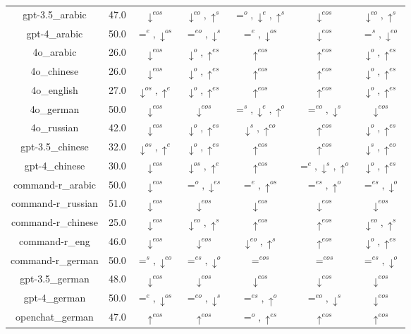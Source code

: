 \documentclass{article}
\begin{document}
\begin{table}[h!]
{\begin{tabular}{ccccccc}
gpt-3.5\_arabic & 47.0 & $\downarrow^{eos}$ & $\downarrow^{eo},\uparrow^{s}$ & $=^{o},\downarrow^{e},\uparrow^{s}$ & $\downarrow^{eos}$ & $\downarrow^{eo},\uparrow^{s}$ \\
gpt-4\_arabic & 50.0 & $=^{e},\downarrow^{os}$ & $=^{eo},\downarrow^{s}$ & $=^{e},\downarrow^{os}$ & $\downarrow^{eos}$ & $=^{s},\downarrow^{eo}$ \\
4o\_arabic & 26.0 & $\downarrow^{eos}$ & $\downarrow^{o},\uparrow^{es}$ & $\uparrow^{eos}$ & $\uparrow^{eos}$ & $\downarrow^{o},\uparrow^{es}$ \\
4o\_chinese & 26.0 & $\downarrow^{eos}$ & $\downarrow^{o},\uparrow^{es}$ & $\uparrow^{eos}$ & $\uparrow^{eos}$ & $\downarrow^{o},\uparrow^{es}$ \\
4o\_english & 27.0 & $\downarrow^{os},\uparrow^{e}$ & $\downarrow^{o},\uparrow^{es}$ & $\uparrow^{eos}$ & $\uparrow^{eos}$ & $\downarrow^{o},\uparrow^{es}$ \\
4o\_german & 50.0 & $\downarrow^{eos}$ & $\downarrow^{eos}$ & $=^{s},\downarrow^{e},\uparrow^{o}$ & $=^{eo},\downarrow^{s}$ & $\downarrow^{eos}$ \\
4o\_russian & 42.0 & $\downarrow^{eos}$ & $\downarrow^{o},\uparrow^{es}$ & $\downarrow^{s},\uparrow^{eo}$ & $\uparrow^{eos}$ & $\downarrow^{o},\uparrow^{es}$ \\
gpt-3.5\_chinese & 32.0 & $\downarrow^{os},\uparrow^{e}$ & $\downarrow^{o},\uparrow^{es}$ & $\uparrow^{eos}$ & $\uparrow^{eos}$ & $\downarrow^{s},\uparrow^{eo}$ \\
gpt-4\_chinese & 30.0 & $\downarrow^{eos}$ & $\downarrow^{os},\uparrow^{e}$ & $\uparrow^{eos}$ & $=^{e},\downarrow^{s},\uparrow^{o}$ & $\downarrow^{o},\uparrow^{es}$ \\
command-r\_arabic & 50.0 & $\downarrow^{eos}$ & $=^{o},\downarrow^{es}$ & $=^{e},\uparrow^{os}$ & $=^{es},\uparrow^{o}$ & $=^{es},\downarrow^{o}$ \\
command-r\_russian & 51.0 & $\downarrow^{eos}$ & $\downarrow^{eos}$ & $\downarrow^{eos}$ & $\downarrow^{eos}$ & $\downarrow^{eos}$ \\
command-r\_chinese & 25.0 & $\downarrow^{eos}$ & $\downarrow^{eo},\uparrow^{s}$ & $\uparrow^{eos}$ & $\uparrow^{eos}$ & $\downarrow^{eo},\uparrow^{s}$ \\
command-r\_eng & 46.0 & $\downarrow^{eos}$ & $\downarrow^{eos}$ & $\downarrow^{eo},\uparrow^{s}$ & $\uparrow^{eos}$ & $\downarrow^{o},\uparrow^{es}$ \\
command-r\_german & 50.0 & $=^{s},\downarrow^{eo}$ & $=^{es},\downarrow^{o}$ & $=^{eos}$ & $=^{eos}$ & $=^{es},\downarrow^{o}$ \\
gpt-3.5\_german & 48.0 & $\downarrow^{eos}$ & $\downarrow^{eos}$ & $\downarrow^{eos}$ & $\downarrow^{eos}$ & $\downarrow^{eos}$ \\
gpt-4\_german & 50.0 & $=^{e},\downarrow^{os}$ & $=^{eo},\downarrow^{s}$ & $=^{es},\uparrow^{o}$ & $=^{eo},\downarrow^{s}$ & $\downarrow^{eos}$ \\
openchat\_german & 47.0 & $\uparrow^{eos}$ & $\uparrow^{eos}$ & $=^{o},\uparrow^{es}$ & $\uparrow^{eos}$ & $\uparrow^{eos}$ \\


\end{tabular}}
\end{table}
\end{document}
